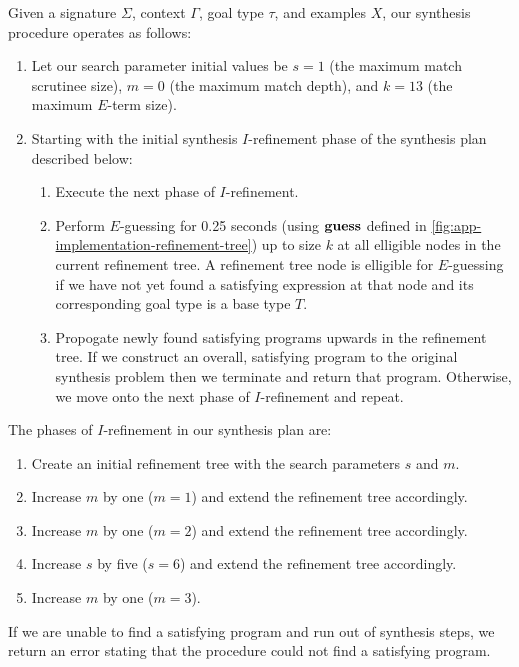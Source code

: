 Given a signature $Σ$, context $Γ$, goal type $τ$, and examples $Χ$, our synthesis procedure operates as follows:
\begin{enumerate}
  \item Let our search parameter initial values be $s = 1$ (the maximum match scrutinee size), $m = 0$ (the maximum match depth), and $k = 13$ (the maximum $E$-term size).
  \item Starting with the initial synthesis $I$-refinement phase of the synthesis plan described below:
    \begin{enumerate}
      \item Execute the next phase of $I$-refinement.
      \item Perform $E$-guessing for 0.25 seconds (using $\mathbf{guess}$ defined in \autoref{fig:app-implementation-refinement-tree}) up to size $k$ at all elligible nodes in the current refinement tree.
        A refinement tree node is elligible for $E$-guessing if we have not yet found a satisfying expression at that node and its corresponding goal type is a base type $T$.
      \item Propogate newly found satisfying programs upwards in the refinement tree.
        If we construct an overall, satisfying program to the original synthesis problem then we terminate and return that program.
        Otherwise, we move onto the next phase of $I$-refinement and repeat.
    \end{enumerate}
\end{enumerate}
The phases of $I$-refinement in our synthesis plan are:
\begin{enumerate}
  \item Create an initial refinement tree with the search parameters $s$ and $m$.
  \item Increase $m$ by one ($m = 1$) and extend the refinement tree accordingly.
  \item Increase $m$ by one ($m = 2$) and extend the refinement tree accordingly.
  \item Increase $s$ by five ($s = 6$) and extend the refinement tree accordingly.
  \item Increase $m$ by one ($m = 3$).
\end{enumerate}
If we are unable to find a satisfying program and run out of synthesis steps, we return an error stating that the procedure could not find a satisfying program.



